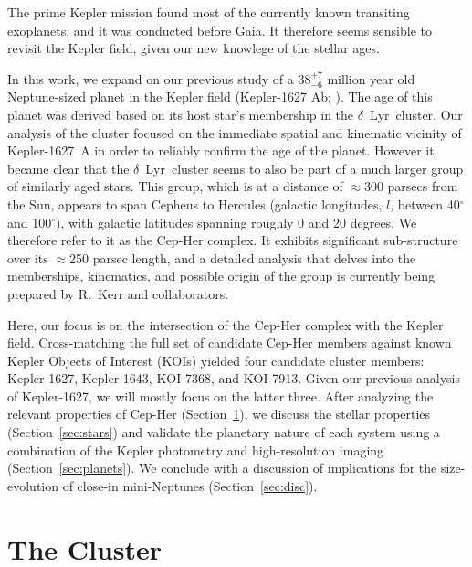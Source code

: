 \documentclass[12pt,twocolumn,linenumbers]{aastex63}
\begin{document}
The prime Kepler mission \citep{borucki_kepler_2010} found most of the
currently known transiting exoplanets, and it was conducted before
Gaia.  It therefore seems sensible to revisit the Kepler field, given
our new knowlege of the stellar ages.

In this work, we expand on our previous study of a $38^{+7}_{-6}$
million year old Neptune-sized planet in the Kepler field (Kepler-1627
Ab; \citealt{bouma_kep1627_2022}).  The age of this planet was derived
based on its host star's membership in the $\delta$\ Lyr\ cluster.
Our analysis of the cluster focused on the immediate spatial and
kinematic vicinity of Kepler-1627~A in order to reliably confirm the
age of the planet.  However it became clear that the $\delta$\ Lyr\
cluster seems to also be part of a much larger group of similarly aged
stars.  This group, which is at a distance of $\approx$300 parsecs
from the Sun, appears to span Cepheus to Hercules (galactic
longitudes, $l$, between 40$^\circ$ and 100$^\circ$), with galactic
latitudes spanning roughly 0 and 20 degrees.  We therefore refer to it
as the Cep-Her complex.  It exhibits significant sub-structure over
its $\approx$250 parsec length, and a detailed analysis that delves
into the memberships, kinematics, and possible origin of the group is
currently being prepared by R.~Kerr and collaborators.

Here, our focus is on the intersection of the Cep-Her complex with the
Kepler field.  Cross-matching the full set of candidate Cep-Her
members against known Kepler Objects of Interest (KOIs)
\citep{thompson_planetary_2018} yielded four candidate cluster
members: Kepler-1627, Kepler-1643, KOI-7368, and KOI-7913.  Given our
previous analysis of Kepler-1627, we will mostly focus on the latter
three.  After analyzing the relevant properties of Cep-Her
(Section~\ref{sec:cluster}), we discuss the stellar properties
(Section~\ref{sec:stars}) and validate the planetary nature of each
system using a combination of the Kepler photometry and
high-resolution imaging (Section~\ref{sec:planets}).  We conclude with
a discussion of implications for the size-evolution of close-in
mini-Neptunes (Section~\ref{sec:disc}).

\section{The Cluster}
\label{sec:cluster}
\end{document}
